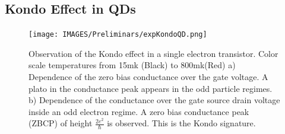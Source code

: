 










\subsection{Kondo Effect in QDs}


\begin{figure}
  \centering
  \texttt{[image: IMAGES/Preliminars/expKondoQD.png]}
  \caption{ \label{fig:ExpKondo} Observation of the Kondo effect in a single electron transistor. Color scale temperatures from 15mk (Black) to 800mk(Red) a) Dependence of the zero bias conductance over the gate voltage. A plato in the conductance peak appears in the odd particle regimes. b) Dependence of the conductance over the gate source drain voltage inside an odd electron regime. A zero bias conductance peak (ZBCP)  of height $\frac{2e^2}{\hbar}$ is observed. This is the Kondo signature.  \protect{}}
\end{figure}


